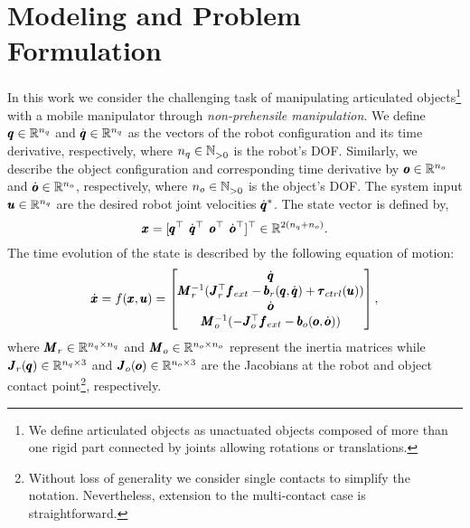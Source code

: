 \section{Modeling and Problem Formulation} \label{sec:formulation}

In this work we consider the challenging task of manipulating articulated objects\footnote{We define articulated objects as unactuated objects composed of more than one rigid part connected by joints allowing rotations or translations.} with a mobile manipulator through \textit{non-prehensile manipulation}. We define $\pmb{q} \in \mathbb{R}^{n_q}$ and $\dot{\pmb{q}} \in \mathbb{R}^{n_q}$ as the vectors of the robot configuration and its time derivative, respectively, where $n_q \in \mathbb{N}^{}_{>0}$ is the robot's DOF.
Similarly, we describe the object configuration and corresponding time derivative by $\pmb{o} \in \mathbb{R}^{n_o}$ and $\dot{\pmb{o}} \in \mathbb{R}^{n_o}$, respectively, where $n_o \in \mathbb{N}^{}_{>0}$ is the object's DOF. The system input $\pmb{u}  \in \mathbb{R}^{n_q}$ are the desired robot joint velocities $\dot{\pmb{q}}^*$. The state vector is defined by,
\begin{equation}
    \pmb{x} = [\pmb{q}^\top \;\, 
      \dot{\pmb{q}}^\top \;\, 
      \pmb{o}^\top \;\,
      \dot{\pmb{o}}^\top ]^\top  \in \mathbb{R}^{2(n_q + n_o)}.
\end{equation}
The time evolution of the state is described by the following equation of motion:
\begin{equation} \label{eq:eom}
    \dot{\pmb{x}} = f(\pmb{x}, \pmb{u}) =  
    \begin{bmatrix}
      \dot{\pmb{q}} \\
      \pmb{M}_r^{-1}(\pmb{J}_{r}^\top \pmb{f}_{ext} - \pmb{b}_{r}(\pmb{q}, \dot{\pmb{q}}) + \pmb{\tau}_{ctrl}(\pmb{u})) \\
      \dot{\pmb{o}} \\
      \pmb{M}_o^{-1}(-\pmb{J}_{o}^\top \pmb{f}_{ext} - \pmb{b}_{o}(\pmb{o}, \dot{\pmb{o}}))
    \end{bmatrix},
\end{equation}
where $\pmb{M}_r \in \mathbb{R}^{n_q \times n_q}$ and $\pmb{M}_o \in \mathbb{R}^{n_o \times n_o}$ represent the inertia matrices while $\pmb{J}_r(\pmb{q}) \in \mathbb{R}^{n_q \times 3}$ and $\pmb{J}_o(\pmb{o}) \in \mathbb{R}^{n_o \times 3}$ are the Jacobians at the robot and object contact point\footnote{Without loss of generality we consider single contacts to simplify the notation. Nevertheless, extension to the multi-contact case is straightforward.}, respectively.
